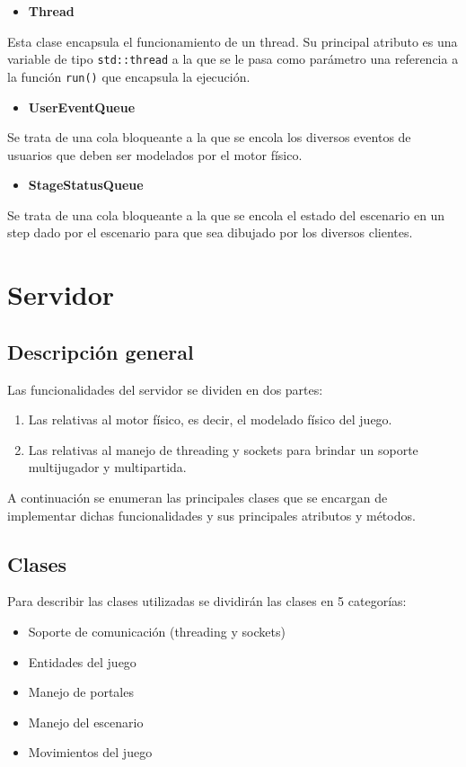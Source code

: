 \documentclass[a4paper]{article}
\begin{document}
\begin{itemize}
	\item \textbf{Thread}
\end{itemize}

Esta clase encapsula el funcionamiento de un thread. Su principal atributo es una variable de tipo \texttt{std::thread} a la que se le pasa como parámetro una
referencia a la función \texttt{run()} que encapsula la ejecución.

\begin{itemize}
	\item \textbf{UserEventQueue}
\end{itemize}

Se trata de una cola bloqueante a la que se encola los diversos eventos de usuarios que deben ser modelados por el motor físico.

\begin{itemize}
	\item \textbf{StageStatusQueue}
\end{itemize}

Se trata de una cola bloqueante a la que se encola el estado del escenario en un step dado por el escenario para que sea dibujado por los diversos clientes.

\section{Servidor}

\subsection{Descripción general}
Las funcionalidades del servidor se dividen en dos partes:
\begin{enumerate}
	\item Las relativas al motor físico, es decir, el modelado físico del juego.
	\item Las relativas al manejo de threading y sockets para brindar un soporte multijugador y multipartida.
\end{enumerate}

A continuación se enumeran las principales clases que se encargan de implementar dichas funcionalidades y sus principales atributos y métodos.

\subsection{Clases}

Para describir las clases utilizadas se dividirán las clases en 5 categorías:
\begin{itemize}
	\item Soporte de comunicación (threading y sockets)
	\item Entidades del juego
	\item Manejo de portales
	\item Manejo del escenario
	\item Movimientos del juego
\end{itemize} 
\end{document}
